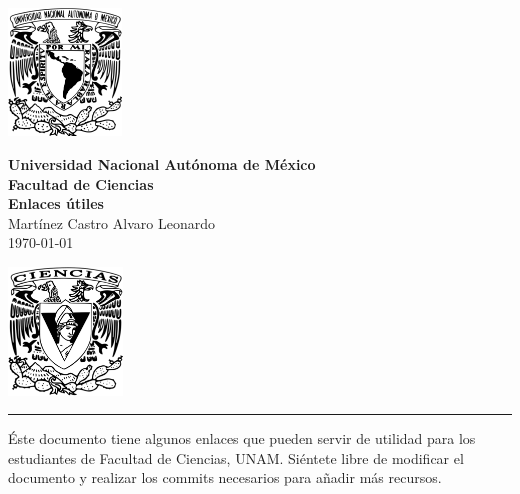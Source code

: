 \documentclass[11pt,letterpaper]{article}
\begin{document}
\begin{center}
    \begin{minipage}{3cm}
    	\begin{center}
    		\includegraphics[height=3.4cm]{Logo_UNAM.png}
    	\end{center}
    \end{minipage}\hfill
    \begin{minipage}{10cm}
    	\begin{center}
    	\textbf{\large Universidad Nacional Autónoma de México}\\[0.1cm]
        \textbf{Facultad de Ciencias}\\[0.1cm]
        \textbf{Enlaces útiles}\\[0.1cm]
        Martínez Castro Alvaro Leonardo\\[0.1cm]
        \today
    	\end{center}
    \end{minipage}\hfill
    \begin{minipage}{3cm}
    	\begin{center}
    		\includegraphics[height=3.4cm]{Logo_FC.png}
    	\end{center}
    \end{minipage}
\end{center}

\rule{17cm}{0.1mm}


\begin{intro}
 Éste documento tiene algunos enlaces que pueden servir de utilidad para los estudiantes de Facultad de Ciencias, UNAM. Siéntete libre de modificar el documento y realizar los commits necesarios para añadir más recursos. 
\end{intro}
\end{document}
